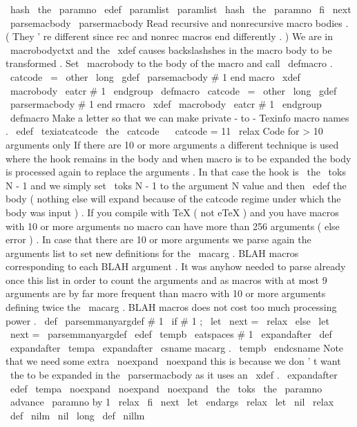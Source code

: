 {{{{{{
\
hash
\
the
\
paramno
}
}
%
\
edef
\
paramlist
{
\
paramlist
\
hash
\
the
\
paramno
}
%
\
fi
\
next
}
%
\
parsemacbody
\
parsermacbody
%
%
Read
recursive
and
nonrecursive
macro
bodies
.
(
They
'
re
different
since
%
rec
and
nonrec
macros
end
differently
.
)
%
%
We
are
in
\
macrobodyctxt
and
the
\
xdef
causes
backslashshes
in
the
macro
%
body
to
be
transformed
.
%
Set
\
macrobody
to
the
body
of
the
macro
and
call
\
defmacro
.
%
{
\
catcode
\
=
\
other
\
long
\
gdef
\
parsemacbody
#
1
end
macro
{
%
\
xdef
\
macrobody
{
\
eatcr
{
#
1
}
}
\
endgroup
\
defmacro
}
}
%
{
\
catcode
\
=
\
other
\
long
\
gdef
\
parsermacbody
#
1
end
rmacro
{
%
\
xdef
\
macrobody
{
\
eatcr
{
#
1
}
}
\
endgroup
\
defmacro
}
}
%
%
Make
a
letter
so
that
we
can
make
private
-
to
-
Texinfo
macro
names
.
\
edef
\
texiatcatcode
{
\
the
\
catcode
\
}
\
catcode
=
11
\
relax
%
%
%
%
%
%
%
%
%
%
%
%
%
%
Code
for
>
10
arguments
only
%
%
%
%
%
%
%
%
%
%
%
%
%
%
%
%
%
%
%
If
there
are
10
or
more
arguments
a
different
technique
is
used
where
the
%
hook
remains
in
the
body
and
when
macro
is
to
be
expanded
the
body
is
%
processed
again
to
replace
the
arguments
.
%
%
In
that
case
the
hook
is
\
the
\
toks
N
-
1
and
we
simply
set
\
toks
N
-
1
to
the
%
argument
N
value
and
then
\
edef
the
body
(
nothing
else
will
expand
because
of
%
the
catcode
regime
under
which
the
body
was
input
)
.
%
%
If
you
compile
with
TeX
(
not
eTeX
)
and
you
have
macros
with
10
or
more
%
arguments
no
macro
can
have
more
than
256
arguments
(
else
error
)
.
%
%
In
case
that
there
are
10
or
more
arguments
we
parse
again
the
arguments
%
list
to
set
new
definitions
for
the
\
macarg
.
BLAH
macros
corresponding
to
%
each
BLAH
argument
.
It
was
anyhow
needed
to
parse
already
once
this
list
%
in
order
to
count
the
arguments
and
as
macros
with
at
most
9
arguments
%
are
by
far
more
frequent
than
macro
with
10
or
more
arguments
defining
%
twice
the
\
macarg
.
BLAH
macros
does
not
cost
too
much
processing
power
.
\
def
\
parsemmanyargdef
#
1
{
%
\
if
#
1
;
\
let
\
next
=
\
relax
\
else
\
let
\
next
=
\
parsemmanyargdef
\
edef
\
tempb
{
\
eatspaces
{
#
1
}
}
%
\
expandafter
\
def
\
expandafter
\
tempa
\
expandafter
{
\
csname
macarg
.
\
tempb
\
endcsname
}
%
%
Note
that
we
need
some
extra
\
noexpand
\
noexpand
this
is
because
we
%
don
'
t
want
\
the
to
be
expanded
in
the
\
parsermacbody
as
it
uses
an
%
\
xdef
.
\
expandafter
\
edef
\
tempa
{
\
noexpand
\
noexpand
\
noexpand
\
the
\
toks
\
the
\
paramno
}
%
\
advance
\
paramno
by
1
\
relax
\
fi
\
next
}
\
let
\
endargs
\
relax
\
let
\
nil
\
relax
\
def
\
nilm
{
\
nil
}
%
\
long
\
def
\
nillm
}}}
